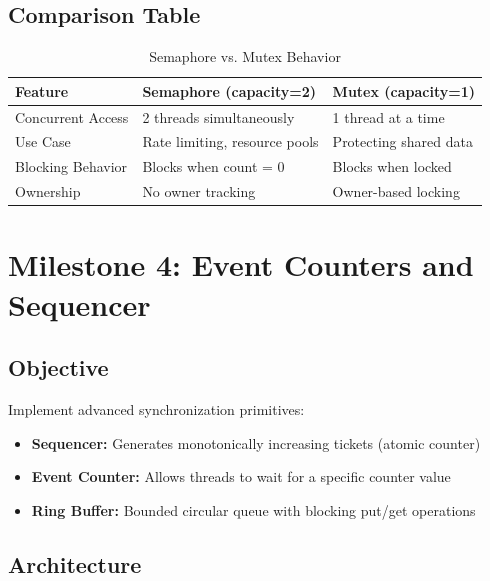 \documentclass[12pt,a4paper]{article}
\begin{document}
\subsection{Comparison Table}
\begin{table}[H]
\centering
\caption{Semaphore vs. Mutex Behavior}
\begin{tabular}{@{}lll@{}}
\toprule
\textbf{Feature} & \textbf{Semaphore (capacity=2)} & \textbf{Mutex (capacity=1)} \\ \midrule
Concurrent Access & 2 threads simultaneously & 1 thread at a time \\
Use Case & Rate limiting, resource pools & Protecting shared data \\
Blocking Behavior & Blocks when count = 0 & Blocks when locked \\
Ownership & No owner tracking & Owner-based locking \\ \bottomrule
\end{tabular}
\end{table}

\clearpage

\section{Milestone 4: Event Counters and Sequencer}

\subsection{Objective}
Implement advanced synchronization primitives:
\begin{itemize}
    \item \textbf{Sequencer:} Generates monotonically increasing tickets (atomic counter)
    \item \textbf{Event Counter:} Allows threads to wait for a specific counter value
    \item \textbf{Ring Buffer:} Bounded circular queue with blocking put/get operations
\end{itemize}

\subsection{Architecture}
\end{document}
